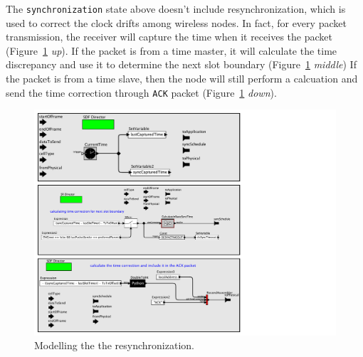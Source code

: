 The \texttt{synchronization} state above doesn't include resynchronization, which is used to correct the clock drifts among wireless nodes. In fact, for every packet transmission, the receiver will capture the time when it receives the packet (Figure~\ref{fig:timeCorrection} {\em up}). If the packet is from a time master, it will calculate the time discrepancy and use it to determine the next slot boundary (Figure~\ref{fig:timeCorrection} {\em middle}) If the packet is from a time slave, then the node will still perform a calcuation and send the time correction through \texttt{ACK} packet (Figure~\ref{fig:timeCorrection} {\em down}).

\begin{figure}[t]
\centering
\includegraphics[width=0.9\columnwidth]{figures/PaperReSynchronization}
\caption{Modelling the the resynchronization.}
\label{fig:timeCorrection}
\end{figure}



